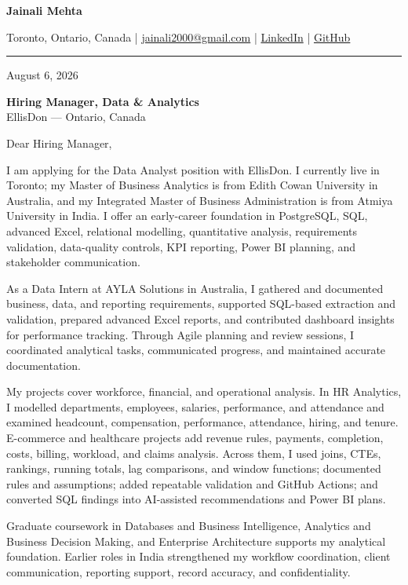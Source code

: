 \documentclass[letterpaper,10pt]{article}
\begin{document}
\begin{center}
  {\fontsize{17}{19}\selectfont\textbf{Jainali Mehta}}\par\vspace{2pt}
  \small Toronto, Ontario, Canada \;|\;
  \href{mailto:jainali2000@gmail.com}{jainali2000@gmail.com} \;|\;
  \href{https://www.linkedin.com/in/jainali-mehta}{LinkedIn} \;|\;
  \href{https://github.com/jainalimehta}{GitHub}
\end{center}
\vspace{-5pt}
\noindent\rule{\textwidth}{0.4pt}

August 6, 2026

\textbf{Hiring Manager, Data \& Analytics}\\
EllisDon --- Ontario, Canada

Dear Hiring Manager,

I am applying for the Data Analyst position with EllisDon. I currently live in Toronto; my Master of Business Analytics is from Edith Cowan University in Australia, and my Integrated Master of Business Administration is from Atmiya University in India. I offer an early-career foundation in PostgreSQL, SQL, advanced Excel, relational modelling, quantitative analysis, requirements validation, data-quality controls, KPI reporting, Power BI planning, and stakeholder communication.

As a Data Intern at AYLA Solutions in Australia, I gathered and documented business, data, and reporting requirements, supported SQL-based extraction and validation, prepared advanced Excel reports, and contributed dashboard insights for performance tracking. Through Agile planning and review sessions, I coordinated analytical tasks, communicated progress, and maintained accurate documentation.

My projects cover workforce, financial, and operational analysis. In HR Analytics, I modelled departments, employees, salaries, performance, and attendance and examined headcount, compensation, performance, attendance, hiring, and tenure. E-commerce and healthcare projects add revenue rules, payments, completion, costs, billing, workload, and claims analysis. Across them, I used joins, CTEs, rankings, running totals, lag comparisons, and window functions; documented rules and assumptions; added repeatable validation and GitHub Actions; and converted SQL findings into AI-assisted recommendations and Power BI plans.

Graduate coursework in Databases and Business Intelligence, Analytics and Business Decision Making, and Enterprise Architecture supports my analytical foundation. Earlier roles in India strengthened my workflow coordination, client communication, reporting support, record accuracy, and confidentiality.
\end{document}
